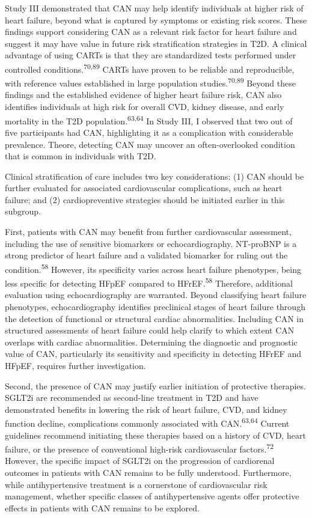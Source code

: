 \documentclass[
  a4paper,
  headsepline=true,
  open=any]{scrbook}
\begin{document}
Study III demonstrated that CAN may help identify individuals at higher
risk of heart failure, beyond what is captured by symptoms or existing
risk scores. These findings support considering CAN as a relevant risk
factor for heart failure and suggest it may have value in future risk
stratification strategies in T2D. A clinical advantage of using CARTs is
that they are standardized tests performed under controlled
conditions.\textsuperscript{70,89} CARTs have proven to be reliable and
reproducible, with reference values established in large population
studies.\textsuperscript{70,89} Beyond these findings and the
established evidence of higher heart failure risk, CAN also identifies
individuals at high risk for overall CVD, kidney disease, and early
mortality in the T2D population.\textsuperscript{63,64} In Study III, I
observed that two out of five participants had CAN, highlighting it as a
complication with considerable prevalence. Theore, detecting CAN may
uncover an often-overlooked condition that is common in individuals with
T2D.

Clinical stratification of care includes two key considerations: (1) CAN
should be further evaluated for associated cardiovascular complications,
such as heart failure; and (2) cardiopreventive strategies should be
initiated earlier in this subgroup.

First, patients with CAN may benefit from further cardiovascular
assessment, including the use of sensitive biomarkers or
echocardiography. NT-proBNP is a strong predictor of heart failure and a
validated biomarker for ruling out the condition.\textsuperscript{58}
However, its specificity varies across heart failure phenotypes, being
less specific for detecting HFpEF compared to HFrEF.\textsuperscript{58}
Therefore, additional evaluation using echocardiography are warranted.
Beyond classifying heart failure phenotypes, echocardiography identifies
preclinical stages of heart failure through the detection of functional
or structural cardiac abnormalities. Including CAN in structured
assessments of heart failure could help clarify to which extent CAN
overlaps with cardiac abnormalities. Determining the diagnostic and
prognostic value of CAN, particularly its sensitivity and specificity in
detecting HFrEF and HFpEF, requires further investigation.

Second, the presence of CAN may justify earlier initiation of protective
therapies. SGLT2i are recommended as second-line treatment in T2D and
have demonstrated benefits in lowering the risk of heart failure, CVD,
and kidney function decline, complications commonly associated with
CAN.\textsuperscript{63,64} Current guidelines recommend initiating
these therapies based on a history of CVD, heart failure, or the
presence of conventional high-risk cardiovascular
factors.\textsuperscript{72} However, the specific impact of SGLT2i on
the progression of cardiorenal outcomes in patients with CAN remains to
be fully understood. Furthermore, while antihypertensive treatment is a
cornerstone of cardiovascular risk management, whether specific classes
of antihypertensive agents offer protective effects in patients with CAN
remains to be explored.
\end{document}
